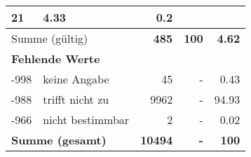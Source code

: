 \begin{longtable}{lXrrr}
       \num{21} &
       \num[round-mode=places,round-precision=2]{4,33} &
         \num[round-mode=places,round-precision=2]{0,2} \\
     \midrule
     \multicolumn{2}{l}{Summe (gültig)} &
       \textbf{\num{485}} &
     \textbf{100} &
       \textbf{\num[round-mode=places,round-precision=2]{4,62}} \\
     \multicolumn{5}{l}{\textbf{Fehlende Werte}}\\
       -998 &
       keine Angabe &
         \num{45} &
        - &
         \num[round-mode=places,round-precision=2]{0,43} \\
       -988 &
       trifft nicht zu &
         \num{9962} &
        - &
         \num[round-mode=places,round-precision=2]{94,93} \\
       -966 &
       nicht bestimmbar &
         \num{2} &
        - &
         \num[round-mode=places,round-precision=2]{0,02} \\
     \midrule
     \multicolumn{2}{l}{\textbf{Summe (gesamt)}} &
          \textbf{\num{10494}} &
        \textbf{-} &
        \textbf{100} \\
     \bottomrule
     \end{longtable}
     

